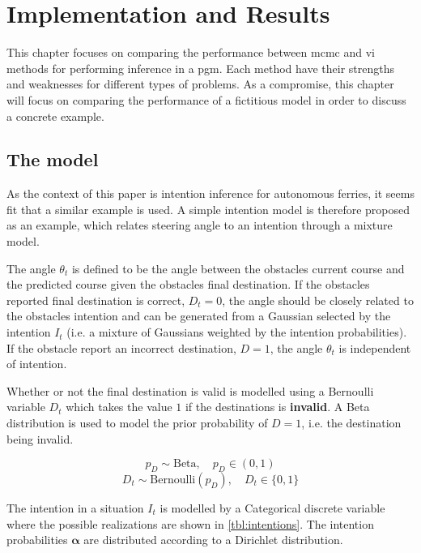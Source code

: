 \chapter{Implementation and Results}

This chapter focuses on comparing the performance between \acrshort{mcmc} and \acrshort{vi} methods for performing inference in a \acrshort{pgm}. Each method have their strengths and weaknesses for different types of problems. As a compromise, this chapter will focus on comparing the performance of a fictitious model in order to discuss a concrete example.  

\section{The model}
As the context of this paper is intention inference for autonomous ferries, it seems fit that a similar example is used. A simple intention model is therefore proposed as an example, which relates steering angle to an intention through a mixture model. 

The angle $\theta_t$ is defined to be the angle between the obstacles current course and the predicted course given the obstacles final destination. If the obstacles reported final destination is correct, $D_t=0$, the angle should be closely related to the obstacles intention and can be generated from a Gaussian selected by the intention $I_t$ (i.e. a mixture of Gaussians weighted by the intention probabilities). If the obstacle report an incorrect destination, $D=1$, the angle $\theta_t$ is independent of intention.

Whether or not the final destination is valid is modelled using a Bernoulli variable $D_t$ which takes the value $1$ if the destinations is \textbf{invalid}. A Beta distribution is used to model the prior probability of $D=1$, i.e. the destination being invalid.  

\begin{equation}
    p_D \sim \text{Beta}, \quad p_D \in (0, 1)
\end{equation}
\begin{equation}
    D_t \sim \text{Bernoulli}(p_D), \quad D_t \in \{0, 1\}
\end{equation}

The intention in a situation $I_t$ is modelled by a Categorical discrete variable where the possible realizations are shown in \cref{tbl:intentions}. The intention probabilities $\boldsymbol{\alpha}$ are distributed according to a Dirichlet distribution.

